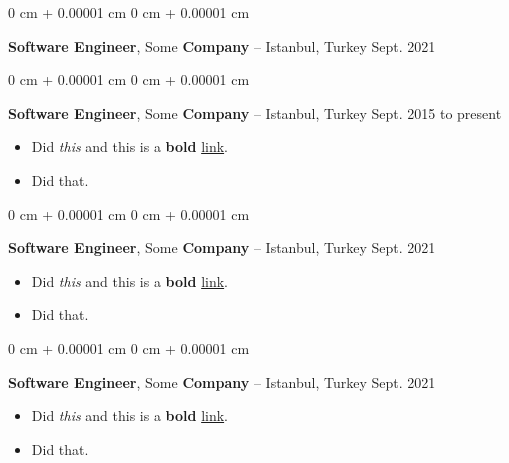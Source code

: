\documentclass[10pt, letterpaper]{article}
\newenvironment{highlights}{
    \begin{itemize}[
        topsep=0.10 cm,
        parsep=0.10 cm,
        partopsep=0pt,
        itemsep=0pt,
        leftmargin=0 cm + 10pt
    ]
}{
    \end{itemize}
        
    \vspace{-0.20cm}
} %
\newenvironment{onecolentry}{
    \begin{adjustwidth}{
        0 cm + 0.00001 cm
    }{
        0 cm + 0.00001 cm
    }
}{
    \end{adjustwidth}
} %
\begin{document}
        \vspace{0.1 cm}

        \begin{onecolentry}
            \textbf{Software Engineer}, Some \textbf{Company} -- Istanbul, Turkey \hfill Sept. 2021
        \end{onecolentry}

        \vspace{0.1 cm}

        \begin{onecolentry}
            \textbf{Software Engineer}, Some \textbf{Company} -- Istanbul, Turkey \hfill Sept. 2015 to present
            \begin{highlights}
                \item Did \textit{this} and this is a \textbf{bold} \href{https://example.com}{link}.
                \item Did that.
            \end{highlights}
        \end{onecolentry}

        \vspace{0.1 cm}

        \begin{onecolentry}
            \textbf{Software Engineer}, Some \textbf{Company} -- Istanbul, Turkey \hfill Sept. 2021
            \begin{highlights}
                \item Did \textit{this} and this is a \textbf{bold} \href{https://example.com}{link}.
                \item Did that.
            \end{highlights}
        \end{onecolentry}

        \vspace{0.1 cm}

        \begin{onecolentry}
            \textbf{Software Engineer}, Some \textbf{Company} -- Istanbul, Turkey \hfill Sept. 2021
            \begin{highlights}
                \item Did \textit{this} and this is a \textbf{bold} \href{https://example.com}{link}.
                \item Did that.
            \end{highlights}
        \end{onecolentry}

        \vspace{0.1 cm}
\end{document}

